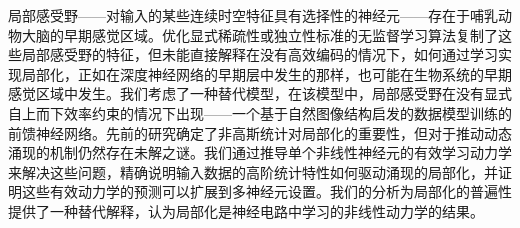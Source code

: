 局部感受野——对输入的某些连续时空特征具有选择性的神经元——存在于哺乳动物大脑的早期感觉区域。优化显式稀疏性或独立性标准的无监督学习算法复制了这些局部感受野的特征，但未能直接解释在没有高效编码的情况下，如何通过学习实现局部化，正如在深度神经网络的早期层中发生的那样，也可能在生物系统的早期感觉区域中发生。我们考虑了一种替代模型，在该模型中，局部感受野在没有显式自上而下效率约束的情况下出现——一个基于自然图像结构启发的数据模型训练的前馈神经网络。先前的研究确定了非高斯统计对局部化的重要性，但对于推动动态涌现的机制仍然存在未解之谜。我们通过推导单个非线性神经元的有效学习动力学来解决这些问题，精确说明输入数据的高阶统计特性如何驱动涌现的局部化，并证明这些有效动力学的预测可以扩展到多神经元设置。我们的分析为局部化的普遍性提供了一种替代解释，认为局部化是神经电路中学习的非线性动力学的结果。\smash{\footnotemark}
